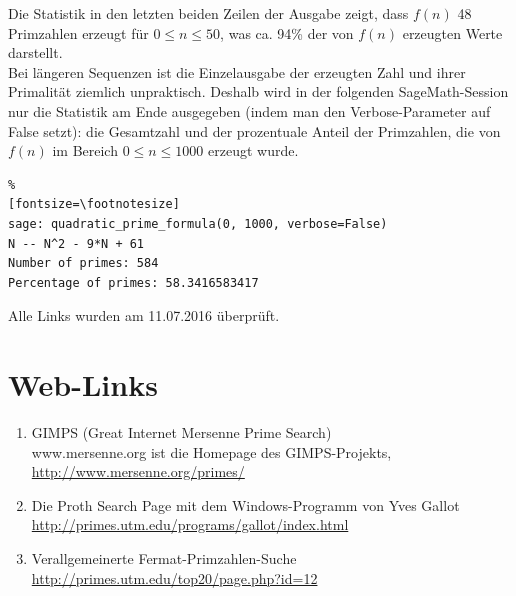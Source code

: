 \begin{refsegment}
 Die Statistik in den letzten beiden Zeilen der Ausgabe zeigt, dass
$f(n)$ 48 Primzahlen erzeugt für $0 \leq n \leq 50$, was ca. 94\% der von
$f(n)$ erzeugten Werte darstellt.\\

Bei längeren Sequenzen ist die Einzelausgabe der erzeugten Zahl und ihrer Primalität
ziemlich unpraktisch. Deshalb wird in der folgenden SageMath-Session nur die Statistik am
Ende ausgegeben (indem man den Verbose-Parameter auf False setzt): die Gesamtzahl und
der prozentuale Anteil der Primzahlen, die von
$f(n)$ im Bereich $0 \leq n \leq 1000$ erzeugt wurde.

\begin{Verbatim}%
[fontsize=\footnotesize]
sage: quadratic_prime_formula(0, 1000, verbose=False)
N -- N^2 - 9*N + 61
Number of primes: 584
Percentage of primes: 58.3416583417
\end{Verbatim}






\printbibliography[%
	heading=subbibintoc,
	title={Literatur zu Kapitel \thechapter},
	segment=\therefsegment,
]

 Alle Links wurden am 11.07.2016 überprüft.


\newpage
\chapter*{Web-Links}

\begin{enumerate}
   \item GIMPS (Great Internet Mersenne Prime Search)
       \\
         www.mersenne.org ist die Homepage des GIMPS-Projekts,  \\
      \url{http://www.mersenne.org/primes/}

\item Die Proth Search Page mit dem Windows-Programm von Yves Gallot \\
      \url{http://primes.utm.edu/programs/gallot/index.html}

\item Verallgemeinerte Fermat-Primzahlen-Suche \\
      \url{http://primes.utm.edu/top20/page.php?id=12}


\end{enumerate}
\end{refsegment}
